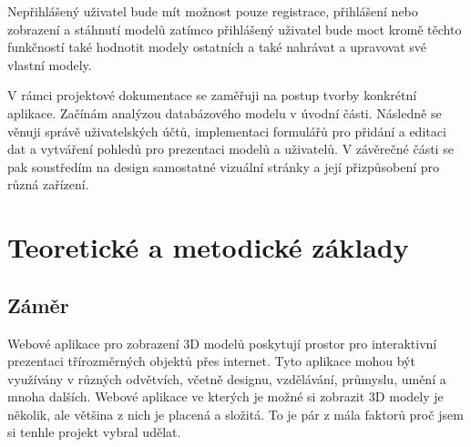 \documentclass[12pt, a4paper,
twoside,        %
openright
]{report}
\begin{document}
Nepřihlášený uživatel bude mít možnost pouze registrace, přihlášení nebo zobrazení a stáhnutí modelů zatímco přihlášený uživatel bude moct kromě těchto funkčností také hodnotit modely ostatních a také nahrávat a upravovat své vlastní modely.

V rámci projektové dokumentace se zaměřuji na postup tvorby konkrétní aplikace. Začínám analýzou databázového modelu v úvodní části. Následně se věnuji správě uživatelských účtů, implementaci formulářů pro přidání a editaci dat a vytváření pohledů pro prezentaci modelů a uživatelů. V závěrečné části se pak soustředím na design samostatné vizuální stránky a její přizpůsobení pro různá zařízení.


\let\cleardoublepage\clearpage

\chapter{Teoretické a metodické základy}

\section{Záměr}
\label{sec:uvod}

Webové aplikace pro zobrazení 3D modelů poskytují prostor pro interaktivní prezentaci třírozměrných objektů přes internet. Tyto aplikace mohou být využívány v různých odvětvích, včetně designu, vzdělávání, průmyslu, umění a mnoha dalších. Webové aplikace ve kterých je možné si zobrazit 3D modely je několik, ale většina z nich je placená a složitá. To je pár z mála faktorů proč jsem si tenhle projekt vybral udělat.
\end{document}
